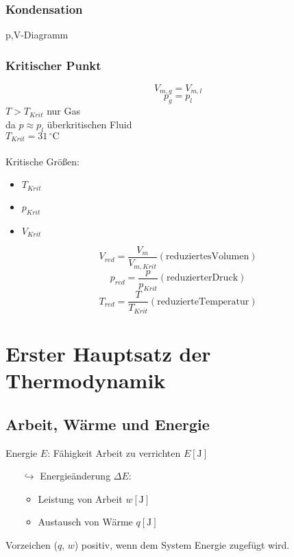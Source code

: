 \documentclass[a4paper]{article}
\begin{document}
\subsubsection{Kondensation}
p,V-Diagramm\\
\subsubsection{Kritischer Punkt}
\begin{equation*}
    V_{m,g} = V_{m,l}
\end{equation*}
\begin{equation*}
    p_g = p_l
\end{equation*}
$T > T_{Krit}$ nur Gas\\
da $p \approx p_l$ überkritischen Fluid\\
 $T_{Krit}=31 \, \mathrm{^\circ C}$\\\\
Kritische Größen:
\begin{itemize}
    \item $T_{Krit}$
    \item $p_{Krit}$
    \item $V_{Krit}$
\end{itemize}
\vspace*{1cm}
\begin{equation*}
    V_{red} = \frac{V_m}{V_{m,Krit}} \mathrm{(reduziertes Volumen)}
\end{equation*}
\begin{equation*}
    p_{red} = \frac{p}{p_{Krit}} \mathrm{(reduzierter Druck)}
\end{equation*}
\begin{equation*}
    T_{red} = \frac{T}{T_{Krit}} \mathrm{(reduzierte Temperatur)}
\end{equation*}

\section{Erster Hauptsatz der Thermodynamik}
\subsection{Arbeit, Wärme und Energie}
Energie $E$: Fähigkeit Arbeit zu verrichten $E [\mathrm{J}]$\\
\begin{itemize}
    \item[$\hookrightarrow$] Energieänderung $\Delta E$:
    \begin{itemize}
        \item Leistung von Arbeit $w [\mathrm{J}]$
        \item Austausch von Wärme $q [\mathrm{J}]$
    \end{itemize}
\end{itemize}
Vorzeichen ($q$, $w$) positiv, wenn dem System Energie zugefügt wird.\\
\end{document}
